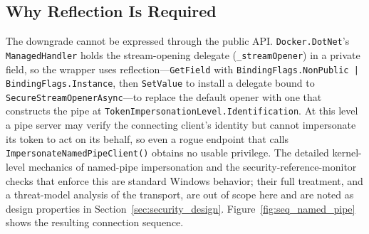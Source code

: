 \subsection{Why Reflection Is Required}
The downgrade cannot be expressed through the public API. \texttt{Docker.DotNet}'s \texttt{ManagedHandler} holds the stream-opening delegate (\texttt{\_streamOpener}) in a private field, so the wrapper uses reflection---\texttt{GetField} with \texttt{BindingFlags.NonPublic | BindingFlags.Instance}, then \texttt{SetValue} to install a delegate bound to \texttt{SecureStreamOpenerAsync}---to replace the default opener with one that constructs the pipe at \texttt{TokenImpersonationLevel.Identification}. At this level a pipe server may verify the connecting client's identity but cannot impersonate its token to act on its behalf, so even a rogue endpoint that calls \texttt{ImpersonateNamedPipeClient()} obtains no usable privilege. The detailed kernel-level mechanics of named-pipe impersonation and the security-reference-monitor checks that enforce this are standard Windows behavior; their full treatment, and a threat-model analysis of the transport, are out of scope here and are noted as design properties in Section~\ref{sec:security_design}. Figure~\ref{fig:seq_named_pipe} shows the resulting connection sequence.

